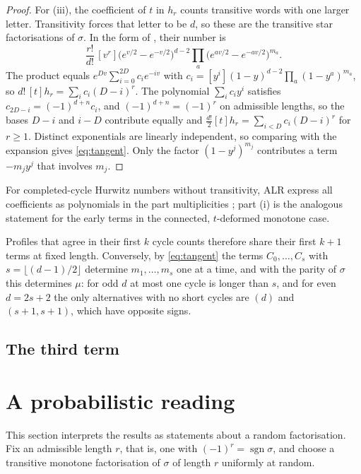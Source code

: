 \documentclass[11pt,a4paper]{article}
\theoremstyle{definition}\newtheorem{definition}[theorem]{Definition}
\theoremstyle{remark}\newtheorem{remark}[theorem]{Remark}\newtheorem{example}[theorem]{Example}
\DeclareMathOperator{\sgn}{sgn}
\numberwithin{equation}{section}
\begin{document}
\begin{proof}
For (iii), the coefficient of $t$ in $h_r$ counts transitive words with one larger letter. Transitivity forces that letter to be $d$, so these are the transitive star factorisations of $\sigma$. In the form of \cite[Eq.~(20)]{clr}, their number is
\[
 \frac{r!}{d!}\,[v^r]\bigl(e^{v/2}-e^{-v/2}\bigr)^{d-2}\prod_{a}\bigl(e^{av/2}-e^{-av/2}\bigr)^{m_a}.
\]
The product equals $e^{Dv}\sum_{i=0}^{2D}c_ie^{-iv}$ with $c_i=[y^i](1-y)^{d-2}\prod_a(1-y^a)^{m_a}$, so $d!\,[t]h_r=\sum_ic_i(D-i)^r$. The polynomial $\sum_ic_iy^i$ satisfies $c_{2D-i}=(-1)^{d+n}c_i$, and $(-1)^{d+n}=(-1)^r$ on admissible lengths, so the bases $D-i$ and $i-D$ contribute equally and $\frac{d!}2[t]h_r=\sum_{i<D}c_i(D-i)^r$ for $r\ge1$. Distinct exponentials are linearly independent, so comparing with the expansion gives \eqref{eq:tangent}. Only the factor $(1-y^j)^{m_j}$ contributes a term $-m_jy^j$ that involves $m_j$.
\end{proof}

For completed-cycle Hurwitz numbers without transitivity, ALR express all coefficients as polynomials in the part multiplicities \cite[Theorem~B]{alr}; part (i) is the analogous statement for the early terms in the connected, $t$-deformed monotone case.

Profiles that agree in their first $k$ cycle counts therefore share their first $k+1$ terms at fixed length. Conversely, by \eqref{eq:tangent} the terms $C_0,\dots,C_s$ with $s=\lfloor(d-1)/2\rfloor$ determine $m_1,\dots,m_s$ one at a time, and with the parity of $\sigma$ this determines $\mu$: for odd $d$ at most one cycle is longer than $s$, and for even $d=2s+2$ the only alternatives with no short cycles are $(d)$ and $(s+1,s+1)$, which have opposite signs.

\subsection{The third term}


\section{A probabilistic reading}\label{sec:prob}
This section interprets the results as statements about a random factorisation. Fix an admissible length $r$, that is, one with $(-1)^r=\sgn\sigma$, and choose a transitive monotone factorisation of $\sigma$ of length $r$ uniformly at random.
\end{document}
